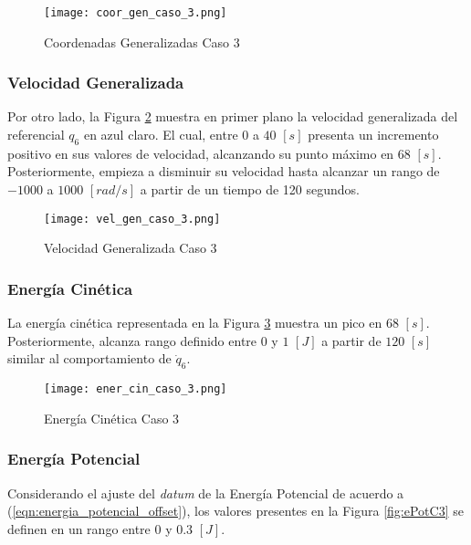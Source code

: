     \begin{figure} [H]%
            \centering
            \texttt{[image: coor\_gen\_caso\_3.png]} 
        \caption{Coordenadas Generalizadas Caso 3}
        \label{fig:CoordGenC3}
    \end{figure}

    \subsubsection{Velocidad Generalizada}
    \noindent Por otro lado, la Figura \ref{fig:VelGenC3} muestra en primer plano la velocidad 
    generalizada del referencial $q_6$ en azul claro. El cual, entre $0$ a $40$ $[s]$
    presenta un incremento positivo en sus valores 
    de velocidad, alcanzando su punto máximo en $68$ $[s]$. Posteriormente,
    empieza a disminuir su velocidad hasta alcanzar un rango de $-1000$ a $1000$ 
    $[rad/s]$ a partir de un tiempo de 120 segundos. 

    \begin{figure}[H]%
            \centering
            \texttt{[image: vel\_gen\_caso\_3.png]} 
        \caption{Velocidad Generalizada Caso 3}
        \label{fig:VelGenC3}
    \end{figure}

    \subsubsection{Energía Cinética}
    \noindent La energía cinética representada en la Figura \ref{fig:eCinC3} muestra 
    un pico en $68$ $[s]$. Posteriormente, alcanza rango definido entre 
    $0$ y $1$ $[J]$ a partir de $120$ $[s]$ similar al comportamiento de $\dot{q}_6$.

    \begin{figure} [H]%
            \centering
            \texttt{[image: ener\_cin\_caso\_3.png]} 
        \caption{Energía Cinética Caso 3}
        \label{fig:eCinC3}
    \end{figure}

    \subsubsection{Energía Potencial}
    \noindent Considerando el ajuste del \emph{datum} de la Energía Potencial de acuerdo a (\ref{eqn:energia_potencial_offset}),
    los valores presentes en la Figura \ref{fig:ePotC3} se definen en un rango entre $0$ y 
    $0.3$ $[J]$.

